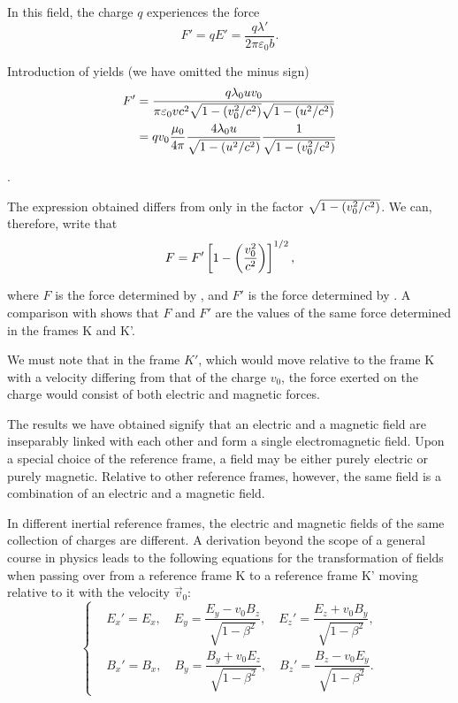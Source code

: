 \noindent
In this field, the charge $q$ experiences the force
\begin{equation*}
    F' = q E' = \frac{q \lambda'}{2\pi\varepsilon_0 b}.
\end{equation*}

\noindent
Introduction of  yields (we have omitted the minus sign)
\begin{align}
    F' &= \frac{q\lambda_0 u v_0}{ \pi\varepsilon_0 vc^2 \sqrt{1 - \left(v_0^2/c^2\right)} \sqrt{1 - \left(u^2/c^2\right)} } \nonumber\\
    &= qv_0 \frac{\mu_0}{4\pi} \frac{4\lambda_0 u}{\sqrt{1 - \left(u^2/c^2\right)}} \frac{1}{\sqrt{1 - \left(v_0^2/c^2\right)}} \label{eq:6_58}
\end{align}

\noindent
[we remind our reader that $\mu_0=1/(\varepsilon_0c^2)$; see \eqn{6_15}].

The expression obtained differs from  only in the factor $\sqrt{1 - \left(v_0^2/c^2\right)}$. We can, therefore, write that
\begin{equation*}
    F = F' \left[ 1 - \left(\frac{v_0^2}{c^2}\right) \right]^{1/2},
\end{equation*}

\noindent
where $F$ is the force determined by , and $F'$ is the force determined by . A comparison with  shows that $F$ and $F'$ are the values of the same force determined in the frames K and K'.

We must note that in the frame $K'$, which would move relative to the frame K with a velocity differing from that of the charge $v_0$, the force exerted on the charge would consist of both electric and magnetic forces.

The results we have obtained signify that an electric and a magnetic field are inseparably linked with each other and form a single electromagnetic field. Upon a special choice of the reference frame, a field may be either purely electric or purely magnetic. Relative to other reference frames, however, the same field is a combination of an electric and a magnetic field.

In different inertial reference frames, the electric and magnetic fields of the same collection of charges are different. A derivation beyond the scope of a general course in physics leads to the following equations for the transformation of fields when passing over from a reference frame K to a reference frame K' moving relative to it with the velocity $\vec{v}_0$:
\begin{equation}\label{eq:6_59}
    \begin{cases}
        & \!\!\!\!\! E_x' = E_x,\quad E_y = \dfrac{E_y-v_0B_z}{\sqrt{1-\beta^2}},\quad E_z' = \dfrac{E_z+v_0B_y}{\sqrt{1-\beta^2}},\\
        & \!\!\!\!\! B_x' = B_x,\quad B_y = \dfrac{B_y+v_0E_z}{\sqrt{1-\beta^2}},\quad B_z' = \dfrac{B_z-v_0E_y}{\sqrt{1-\beta^2}}.
    \end{cases}
\end{equation}

